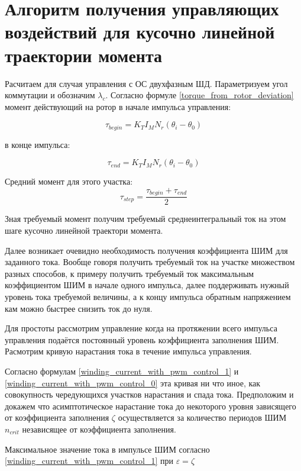 \newpage
\part{ Алгоритм получения управляющих воздействий для кусочно линейной траектории момента }

Расчитаем для случая управления с ОС двухфазным ШД. Параметризуем угол коммутации и обозначим
$\lambda_c$.
Согласно формуле \ref{torque_from_rotor_deviation} момент действующий на ротор в начале импульса
управления:

\begin{equation}
    \label{moment_to_rotor_at_the_begin_of_control_pulse}    
    \tau_{begin} = K_{T} I_{M} N_{r} (\theta_{i} - \theta_{0})
\end{equation}

в конце импульса:

\begin{equation}
    \label{moment_to_rotor_at_the_end_of_control_pulse}    
    \tau_{end} = K_{T} I_{M} N_{r} (\theta_{i} - \theta_{0})
\end{equation}

Средний момент для этого участка:
$$
    \tau_{step} = \frac{ \tau_{begin} + \tau_{end} }{ 2 }
$$

Зная требуемый момент получим требуемый среднеинтегральный ток на этом шаге кусочно линейной
траектори момента. 

Далее возникает очевидно необходимость получения коэффициента ШИМ для заданного тока. Вообще говоря
получить требуемый ток на участке множеством разных способов, к примеру получить требуемый ток
максимальным коэффициентом ШИМ в начале одного импульса, далее поддерживать нужный уровень тока
требуемой величины, а к концу импульса обратным напряжением кам можно быстрее снизить ток до нуля.

Для простоты рассмотрим управление когда на протяжении всего импульса управления подаётся постоянный
уровень коэффициента заполнения ШИМ. Расмотрим кривую нарастания тока в течение импульса управления.

Согласно формулам \ref{winding_current_with_pwm_control_1} 
и \ref{winding_current_with_pwm_control_0} эта кривая ни что иное, как совокупность чередующихся
участков нарастания и спада тока. Предположим и докажем что асимптотическое нарастание тока до
некоторого уровня зависящего от коэффициента заполнения $\zeta$ осуществляется за количество периодов ШИМ
$n_{crit}$ независящее от коэффициента заполнения. 

Максимальное значение тока в импульсе ШИМ согласно \ref{winding_current_with_pwm_control_1} при
$\varepsilon=\zeta$



